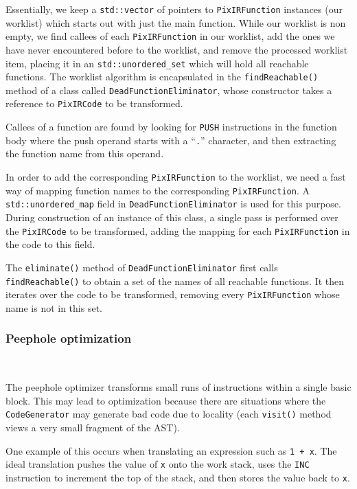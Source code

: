 \documentclass[11pt,a4paper]{scrartcl}
\begin{document}
Essentially, we keep a \verb|std::vector| of pointers to \verb|PixIRFunction| instances (our worklist) which starts out with just the main function. While our worklist is non empty, we find callees of each \verb|PixIRFunction| in our worklist, add the ones we have never encountered before to the worklist, and remove the processed worklist item, placing it in an \verb|std::unordered_set| which will hold all reachable functions. The worklist algorithm is encapsulated in the \verb|findReachable()| method of a class called \verb|DeadFunctionEliminator|, whose constructor takes a reference to \verb|PixIRCode| to be transformed.

Callees of a function are found by looking for \verb|PUSH| instructions in the function body where the push operand starts with a ``\verb|.|'' character, and then extracting the function name from this operand.

In order to add the corresponding \verb|PixIRFunction| to the worklist, we need a fast way of mapping function names to the corresponding \verb|PixIRFunction|. A \verb|std::unordered_map| field in \verb|DeadFunctionEliminator| is used for this purpose. During construction of an instance of this class, a single pass is performed over the \verb|PixIRCode| to be transformed, adding the mapping for each \verb|PixIRFunction| in the code to this field.

The \verb|eliminate()| method of \verb|DeadFunctionEliminator| first calls \verb|findReachable()| to obtain a set of the names of all reachable functions. It then iterates over the code to be transformed, removing every \verb|PixIRFunction| whose name is not in this set.

\subsubsection{Peephole optimization}~\label{sec:peephole}

The peephole optimizer transforms small runs of instructions within a single basic block. This may lead to optimization because there are situations where the \verb|CodeGenerator| may generate bad code due to locality (each \verb|visit()| method views a very small fragment of the AST).

One example of this occurs when translating an expression such as \verb|1 + x|. The ideal translation pushes the value of \verb|x| onto the work stack, uses the \verb|INC| instruction to increment the top of the stack, and then stores the value back to \verb|x|.
\end{document}
